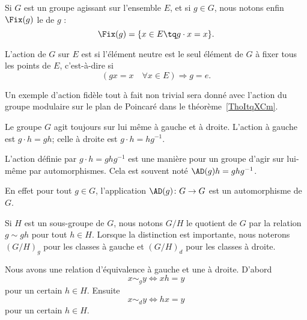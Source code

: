 \begin{definition}[Fixateur]
	Si \( G\) est un groupe agissant sur l'ensemble \( E\), et si \( g\in G\), nous notons enfin \( \Fix(g)\) le  de \( g\) :
	\begin{equation}
		\Fix(g)=\{ x\in E\tq g\cdot x=x \}.
	\end{equation}
\end{definition}

\begin{definition}  \label{DefuyYJRh}
	L'action de \( G\) sur \( E\) est  si l'élément neutre est le seul élément de \( G\) à fixer tous les points de \( E\), c'est-à-dire si
	\begin{equation}
		(gx=x\quad \forall x\in E)\Rightarrow g=e.
	\end{equation}
\end{definition}

Un exemple d'action fidèle tout à fait non trivial sera donné avec l'action du groupe modulaire sur le plan de Poincaré dans le théorème~\ref{ThoItqXCm}.

Le groupe \( G\) agit toujours sur lui même à gauche et à droite. L'action à gauche est \( g\cdot h=gh\); celle à droite est \( g\cdot h=hg^{-1}\).

\begin{definition}      \label{DEFooCORTooEeOLPT}
	L'action  définie par \( g\cdot h=ghg^{-1}\) est une manière pour un groupe d'agir sur lui-même par automorphismes. Cela est souvent noté \( \AD(g)h=ghg^{-1}\).
\end{definition}
En effet pour tout \( g\in G\), l'application \( \AD(g)\colon G\to G\) est un automorphisme de \( G\).

Si \( H\) est un sous-groupe de  \( G\), nous notons \( G/H\) le quotient de \( G\) par la relation \( g\sim gh\) pour tout \( h\in H\). Lorsque la distinction est importante, nous noterons \( (G/H)_g\) pour les classes à gauche et \( (G/H)_d\) pour les classes à droite.

Nous avons une relation d'équivalence à gauche et une à droite. D'abord
\begin{equation}
	x\sim_g y\Leftrightarrow xh=y
\end{equation}
pour un certain \( h\in H\). Ensuite
\begin{equation}
	x\sim_d y\Leftrightarrow hx=y
\end{equation}
pour un certain \( h\in H\).

